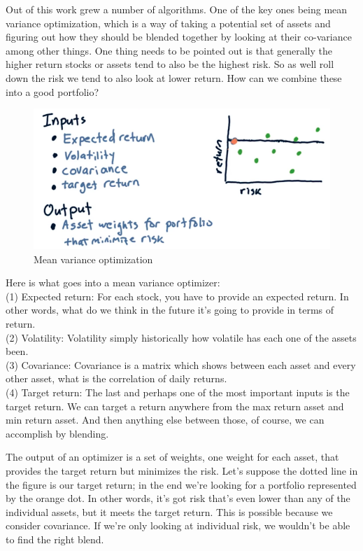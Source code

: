 \documentclass[12pt]{article}
\begin{document}
Out of this work grew a number of algorithms. One of the key ones being mean variance optimization, which is a way of taking a potential set of assets and figuring out how they should be blended together by looking at their co-variance among other things. One thing needs to be pointed out is that generally the higher return stocks or assets tend to also be the highest risk. So as well roll down the risk we tend to also look at lower return. How can we combine these into a good portfolio?

\begin{figure}[!ht]
\centering
\includegraphics[scale=0.45]{fig/fig69}
\caption{Mean variance optimization}
\end{figure}

Here is what goes into a mean variance optimizer:\\
(1) Expected return: For each stock, you have to provide an expected return. In other words, what do we think in the future it's going to provide in terms of return. \\
(2) Volatility: Volatility simply historically how volatile has each one of the assets been. \\
(3) Covariance: Covariance is a matrix which shows between each asset and every other asset, what is the correlation of daily returns. \\
(4) Target return: The last and perhaps one of the most important inputs is the target return. We can target a return anywhere from the max return asset and min return asset. And then anything else between those, of course, we can accomplish by blending. 

The output of an optimizer is a set of weights, one weight for each asset, that provides the target return but minimizes the risk. Let's suppose the dotted line in the figure is our target return; in the end we're looking for a portfolio represented by the orange dot.  In other words, it's got risk that's even lower than any of the individual assets, but it meets the target return. This is possible because we consider covariance. If we're only looking at individual risk, we wouldn't be able to find the right blend. 
\end{document}
